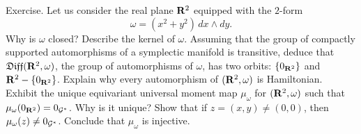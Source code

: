 \begin{Article}{Exercise.}{}
  \label{Injective-universal-moment-map-for-a-non-symplectic-form} 
  Let us consider the real plane $\mathbf{R}^2$ equipped with the $2$-form
  $$
    \omega = (x^2 + y^2)\, dx \wedge dy.
    $$
   Why is $\omega$ closed?
   Describe the kernel of $\omega$.
  Assuming that the group of
  compactly supported automorphisms of a symplectic manifold is transitive,
  deduce that $\mathfrak{Diff}(\mathbf{R}^2, \omega)$,
  the group of automorphisms of $\omega$,
   has two orbits:
  $\{0_{\mathbf{R}^2}\}$ and $\mathbf{R}^2 - \{0_{\mathbf{R}^2}\}$.
   Explain why every automorphism of $(\mathbf{R}^2, \omega)$ is Hamiltonian.
   Exhibit the unique equivariant universal moment map $\mu_\omega$
  for $(\mathbf{R}^2, \omega)$ such that $\mu_\omega(0_{\mathbf{R}^2}) = 0_{\mathcal{G}^*}$.
   Why is it unique?
   Show that if $z=(x,y) \neq (0,0)$,
  then $\mu_\omega(z) \neq 0_{\mathcal{G}^*}$.
  Conclude that $\mu_\omega$ is injective.
\end{Article}

